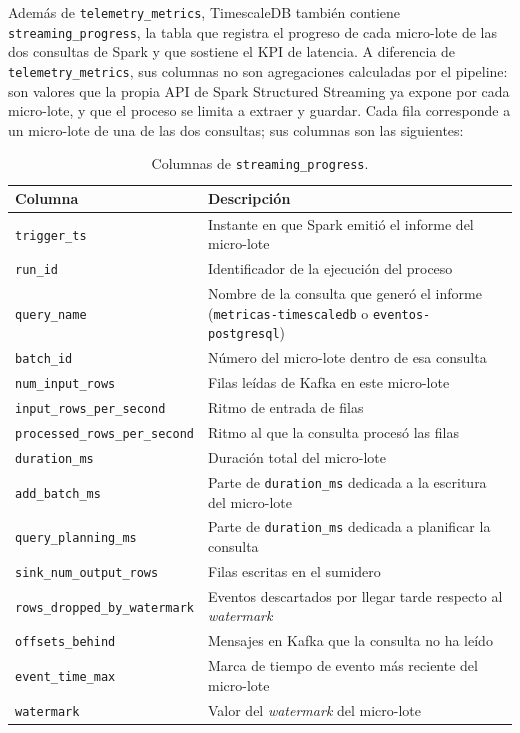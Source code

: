 Además de \texttt{telemetry\_metrics}, TimescaleDB también contiene \texttt{streaming\_progress}, la tabla que registra el progreso de cada micro-lote de las dos consultas de Spark y que sostiene el KPI de latencia. A diferencia de \texttt{telemetry\_metrics}, sus columnas no son agregaciones calculadas por el pipeline: son valores que la propia API de Spark Structured Streaming ya expone por cada micro-lote, y que el proceso se limita a extraer y guardar. Cada fila corresponde a un micro-lote de una de las dos consultas; sus columnas son las siguientes:

\begin{table}[H]
  \centering
  \begin{tabular}{|l|p{9cm}|}
    \hline
    \textbf{Columna} & \textbf{Descripción} \\ \hline
    \texttt{trigger\_ts} & Instante en que Spark emitió el informe del micro-lote \\ \hline
    \texttt{run\_id} & Identificador de la ejecución del proceso \\ \hline
    \texttt{query\_name} & Nombre de la consulta que generó el informe (\texttt{metricas-timescaledb} o \texttt{eventos-postgresql}) \\ \hline
    \texttt{batch\_id} & Número del micro-lote dentro de esa consulta \\ \hline
    \texttt{num\_input\_rows} & Filas leídas de Kafka en este micro-lote \\ \hline
    \texttt{input\_rows\_per\_second} & Ritmo de entrada de filas \\ \hline
    \texttt{processed\_rows\_per\_second} & Ritmo al que la consulta procesó las filas \\ \hline
    \texttt{duration\_ms} & Duración total del micro-lote \\ \hline
    \texttt{add\_batch\_ms} & Parte de \texttt{duration\_ms} dedicada a la escritura del micro-lote \\ \hline
    \texttt{query\_planning\_ms} & Parte de \texttt{duration\_ms} dedicada a planificar la consulta \\ \hline
    \texttt{sink\_num\_output\_rows} & Filas escritas en el sumidero \\ \hline
    \texttt{rows\_dropped\_by\_watermark} & Eventos descartados por llegar tarde respecto al \textit{watermark} \\ \hline
    \texttt{offsets\_behind} & Mensajes en Kafka que la consulta no ha leído \\ \hline
    \texttt{event\_time\_max} & Marca de tiempo de evento más reciente del micro-lote \\ \hline
    \texttt{watermark} & Valor del \textit{watermark} del micro-lote \\ \hline
  \end{tabular}
  \caption{Columnas de \texttt{streaming\_progress}.}
  \label{tab:columnas-streaming-progress}
\end{table}

